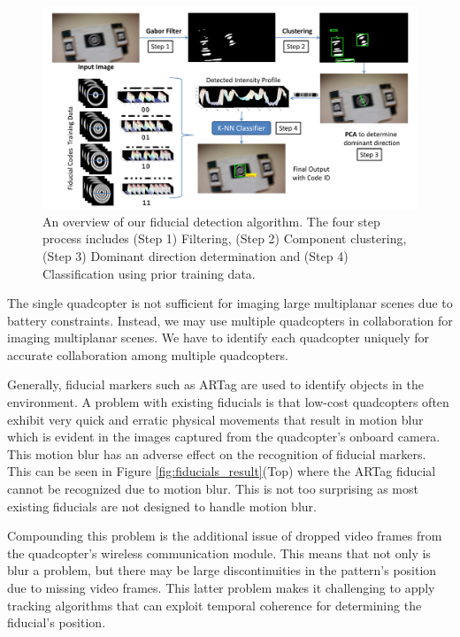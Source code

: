 \begin{figure}[h!]
\centering
\includegraphics[width=0.98\linewidth]{figures/fiducial/overall_flow}
\caption[Overall Workflow of blur resilient fiducial detection algorithm]{An
overview of our fiducial detection algorithm.
    The four step process includes (Step 1) Filtering,
    (Step 2) Component clustering, (Step 3) Dominant direction determination
    and (Step 4) Classification using prior training data.}
 \label{fig:fiducial_workflow}
\end{figure}

The single quadcopter is not sufficient for imaging large multiplanar scenes due to
battery constraints. Instead, we may use multiple quadcopters in
collaboration for imaging multiplanar scenes. We have to identify each
quadcopter uniquely for accurate collaboration among multiple quadcopters. 

Generally, fiducial markers such as ARTag\cite{Fiala05} are used to identify
objects in the environment. A problem with existing fiducials is that low-cost
quadcopters often exhibit very quick and erratic physical movements that result
in motion blur which is evident in the images captured from the quadcopter's
onboard camera. This motion blur has an adverse effect on the recognition of fiducial
markers. This can be seen in Figure \ref{fig:fiducials_result}(Top) where the
ARTag fiducial cannot be recognized due to motion blur. This is not too
surprising as most existing fiducials are not designed to handle motion blur.

Compounding this problem is the additional issue of dropped video
frames from the quadcopter's wireless communication module. This means
that not only is blur a problem, but there may be large
discontinuities in the pattern's position due to missing video
frames. This latter problem makes it challenging to apply tracking algorithms
that can exploit temporal coherence for determining the fiducial's position.

